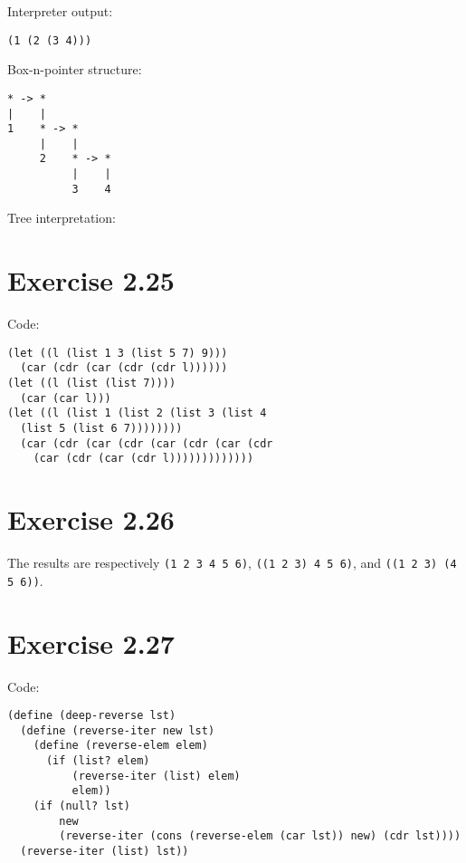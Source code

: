 \documentclass[../main.tex]{subfiles}
\begin{document}
Interpreter output:

\begin{lstlisting}
(1 (2 (3 4)))
\end{lstlisting}

Box-n-pointer structure:

\begin{lstlisting}
* -> *
|    |
1    * -> *
     |    |
     2    * -> *
          |    |
          3    4
\end{lstlisting}

Tree interpretation:

\vspace{2mm}


\section{Exercise 2.25}

Code:

\begin{lstlisting}
(let ((l (list 1 3 (list 5 7) 9)))
  (car (cdr (car (cdr (cdr l))))))
(let ((l (list (list 7))))
  (car (car l)))
(let ((l (list 1 (list 2 (list 3 (list 4
  (list 5 (list 6 7))))))))
  (car (cdr (car (cdr (car (cdr (car (cdr
    (car (cdr (car (cdr l)))))))))))))
\end{lstlisting}

\section{Exercise 2.26}

The results are respectively
\lstinline{(1 2 3 4 5 6)},
\lstinline{((1 2 3) 4 5 6)},
and \lstinline{((1 2 3) (4 5 6))}.

\section{Exercise 2.27}

Code:

\begin{lstlisting}
(define (deep-reverse lst)
  (define (reverse-iter new lst)
    (define (reverse-elem elem)
      (if (list? elem)
          (reverse-iter (list) elem)
          elem))
    (if (null? lst)
        new
        (reverse-iter (cons (reverse-elem (car lst)) new) (cdr lst))))
  (reverse-iter (list) lst))
\end{lstlisting}
\end{document}

